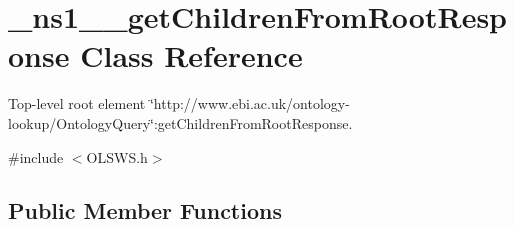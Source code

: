 \hypertarget{class__ns1____getChildrenFromRootResponse}{
\section{\_\-ns1\_\-\_\-getChildrenFromRootResponse Class Reference}
\label{class__ns1____getChildrenFromRootResponse}
}


Top-\/level root element \char`\"{}http://www.ebi.ac.uk/ontology-\/lookup/OntologyQuery\char`\"{}:getChildrenFromRootResponse.  




{\ttfamily \#include $<$OLSWS.h$>$}

\subsection*{Public Member Functions}
